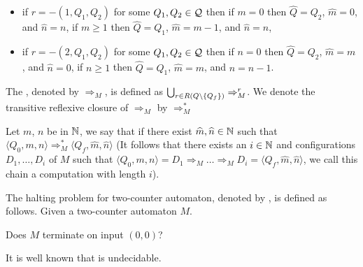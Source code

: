 \begin{definition}
\begin{itemize}
		\item if $r=-(1,Q_1,Q_2)$ for some $Q_1,Q_2\in \mathcal{Q}$ then
\subitem if $m=0$ then $\widehat{Q}=Q_2$, $\widehat{m}=0$, and $\widehat{n}=n$,
\subitem if $m\geq1$ then $\widehat{Q}=Q_1$, $\widehat{m}=m-1$, and $\widehat{n}=n$,
		\item if $r=-(2,Q_1,Q_2)$ for some $Q_1,Q_2\in \mathcal{Q}$ then
\subitem if $n=0$ then $\widehat{Q}=Q_2$, $\widehat{m}=m$, and $\widehat{n}=0$,
\subitem if $n\geq1$ then $\widehat{Q}=Q_1$, $\widehat{m}=m$, and $\widehat{n}=n-1$.
	\end{itemize}
	The , denoted by $\Rightarrow_M$, is defined as $\bigcup_{r\in R(Q\setminus\{Q_f\})}\Rightarrow^r_M$. We denote the transitive reflexive closure of $\Rightarrow_M$ by $\Rightarrow^*_M$
		
	Let $m$, $n$ be in $\mathbb{N}$, we say that  if there exist $\widehat{m},\widehat{n}\in\mathbb{N}$ such that $\langle Q_0,m,n\rangle\Rightarrow^*_M\langle Q_f,\widehat{m},\widehat{n}\rangle$ (It follows that there exists an $i\in\mathbb{N}$ and configurations $D_1,\dots,D_i$ of $M$ such that $\langle Q_0,m,n\rangle= D_1\Rightarrow_M\dots\Rightarrow_M D_i=\langle Q_f,\widehat{m},\widehat{n}\rangle$, we call this chain a computation with length $i$).
\end{definition}
\begin{definition}\label{def.2.25}
	The halting problem for two-counter automaton, denoted by \autHalt{}, is defined as follows.
	Given a two-counter automaton $M$. 
	\begin{center}
		Does $M$ terminate on input $(0,0)$?
	\end{center}
\end{definition}
It is well known that \autHalt{} is undecidable. %
